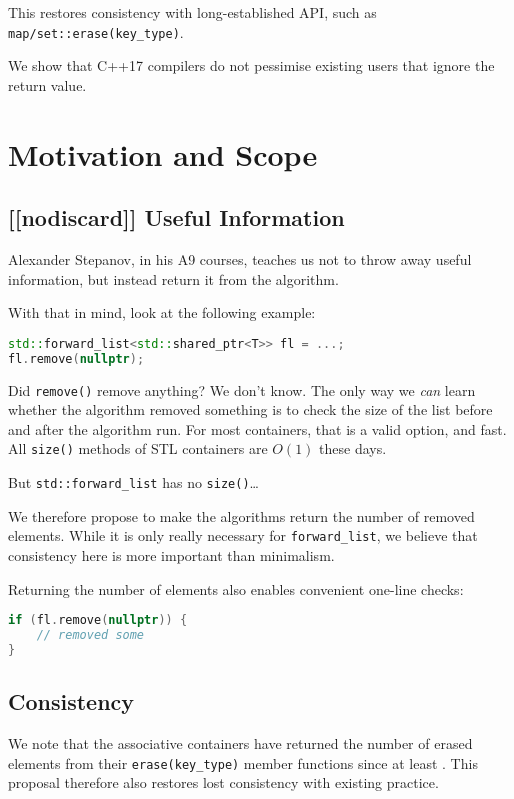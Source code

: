 \documentclass[11pt]{article}
\begin{document}
This restores consistency with long-established API, such as
\texttt{map/set::erase(key\_type)}.

We show that C++17 compilers do not pessimise existing users that
ignore the return value.

\section{Motivation and Scope}

\subsection{[[nodiscard]] Useful Information}

Alexander Stepanov, in his A9 courses\cite{A9}, teaches us not to
throw away useful information, but instead return it from the
algorithm.

With that in mind, look at the following example:
\begin{lstlisting}[language=C++]
std::forward_list<std::shared_ptr<T>> fl = ...;
fl.remove(nullptr);
\end{lstlisting}
Did \texttt{remove()} remove anything? We don't know. The only way we
\emph{can} learn whether the algorithm removed something is to check
the size of the list before and after the algorithm run. For most
containers, that is a valid option, and fast. All \texttt{size()}
methods of STL containers are $O(1)$ these days.

But \texttt{std::forward\_list} has no \texttt{size()}\ldots

We therefore propose to make the algorithms return the number of
removed elements. While it is only really necessary for
\texttt{forward\_list}, we believe that consistency here is more
important than minimalism.

Returning the number of elements also enables convenient one-line
checks:
\begin{lstlisting}[language=C++]
if (fl.remove(nullptr)) {
    // removed some
}
\end{lstlisting}

\subsection{Consistency}

We note that the associative containers have returned the number of
erased elements from their \texttt{erase(key\_type)} member functions
since at least \cite{STL}. This proposal therefore also restores
lost consistency with existing practice.
\end{document}
